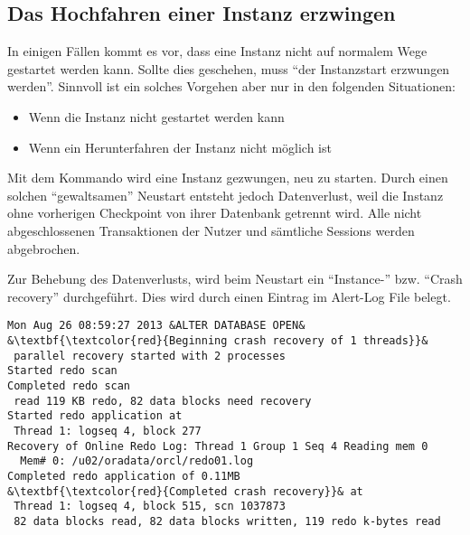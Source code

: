       \subsection{Das Hochfahren einer Instanz erzwingen}
        In einigen F\"allen kommt es vor, dass eine Instanz nicht auf normalem Wege gestartet werden kann. Sollte dies geschehen, muss \enquote{der Instanzstart erzwungen werden}. Sinnvoll ist ein solches Vorgehen aber nur in den folgenden Situationen:
        \begin{itemize}
          \item Wenn die Instanz nicht gestartet werden kann
          \item Wenn ein Herunterfahren der Instanz nicht m\"oglich ist
        \end{itemize}
        Mit dem Kommando  wird eine Instanz gezwungen, neu zu starten. Durch einen solchen \enquote{gewaltsamen} Neustart entsteht jedoch Datenverlust, weil die Instanz ohne vorherigen Checkpoint von ihrer Datenbank getrennt wird. Alle nicht abgeschlossenen Transaktionen der Nutzer und s\"amtliche Sessions werden abgebrochen.

        Zur Behebung des Datenverlusts, wird beim Neustart ein
        \enquote{Instance-} bzw. \enquote{Crash recovery} durchgef\"uhrt. Dies
        wird durch einen Eintrag im Alert-Log File belegt.
        \begin{lstlisting}[caption={Ein erzwungener Neustart der Instanz und
        seine Folgen - Der Eintrag im Alert Log
        File},label=admin07,language=terminal]
Mon Aug 26 08:59:27 2013 &ALTER DATABASE OPEN& 
&\textbf{\textcolor{red}{Beginning crash recovery of 1 threads}}&
 parallel recovery started with 2 processes
Started redo scan
Completed redo scan
 read 119 KB redo, 82 data blocks need recovery
Started redo application at
 Thread 1: logseq 4, block 277
Recovery of Online Redo Log: Thread 1 Group 1 Seq 4 Reading mem 0
  Mem# 0: /u02/oradata/orcl/redo01.log
Completed redo application of 0.11MB
&\textbf{\textcolor{red}{Completed crash recovery}}& at
 Thread 1: logseq 4, block 515, scn 1037873
 82 data blocks read, 82 data blocks written, 119 redo k-bytes read
        \end{lstlisting}

